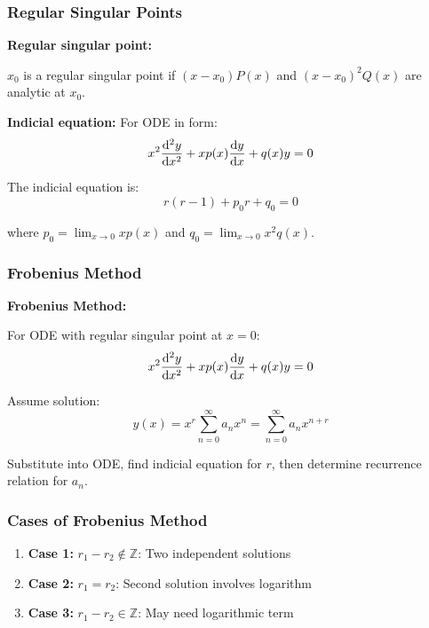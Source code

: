 \documentclass[12pt,a4paper]{article}
\begin{document}
\subsubsection{Regular Singular Points}
\begin{formulabox}
\textbf{Regular singular point:}

$x_0$ is a regular singular point if $(x-x_0)P(x)$ and $(x-x_0)^2 Q(x)$ are analytic at $x_0$.

\textbf{Indicial equation:} For ODE in form:
\begin{equation}
x^2\dv[2]{y}{x} + xp(x)\dv{y}{x} + q(x)y = 0
\end{equation}

The indicial equation is:
\begin{equation}
r(r-1) + p_0 r + q_0 = 0
\end{equation}

where $p_0 = \lim_{x \to 0} xp(x)$ and $q_0 = \lim_{x \to 0} x^2 q(x)$.
\end{formulabox}

\subsubsection{Frobenius Method}
\begin{importantbox}
\textbf{Frobenius Method:}

For ODE with regular singular point at $x = 0$:
\begin{equation}
x^2\dv[2]{y}{x} + xp(x)\dv{y}{x} + q(x)y = 0
\end{equation}

Assume solution:
\begin{equation}
y(x) = x^r \sum_{n=0}^{\infty} a_n x^n = \sum_{n=0}^{\infty} a_n x^{n+r}
\end{equation}

Substitute into ODE, find indicial equation for $r$, then determine recurrence relation for $a_n$.
\end{importantbox}

\subsubsection{Cases of Frobenius Method}
\begin{enumerate}
    \item \textbf{Case 1:} $r_1 - r_2 \notin \mathbb{Z}$: Two independent solutions
    \item \textbf{Case 2:} $r_1 = r_2$: Second solution involves logarithm
    \item \textbf{Case 3:} $r_1 - r_2 \in \mathbb{Z}$: May need logarithmic term
\end{enumerate}
\end{document}
